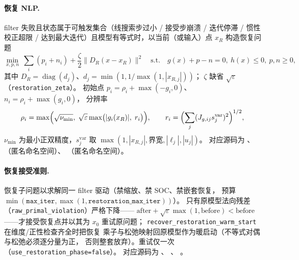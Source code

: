 \paragraph{恢复 NLP.}
filter 失败且状态属于可触发集合（线搜索步过小 / 接受步崩溃 / 迭代停滞 /
惯性校正超限 / 达到最大迭代）且模型有等式时，以当前（或输入）点 $x_R$
构造恢复问题
\begin{equation}
  \min_{x, p, n}\ \sum_i (p_i + n_i) + \frac{\zeta}{2}
  \|D_R (x - x_R)\|^{2}
  \quad \text{s.t.}\quad g(x) + p - n = 0,\ h(x) \le 0,\ p, n \ge 0,
  \label{eq:ipm:restoration}
\end{equation}
其中 $D_R = \operatorname{diag}(d_j)$、$d_j = \min(1, 1/\max(1, |x_{R,j}|))$；
$\zeta$ 缺省 $\sqrt{\varepsilon}$（\texttt{restoration\_zeta}）。
初始点 $p_i = \rho_i + \max(-g_i, 0)$、$n_i = \rho_i + \max(g_i, 0)$，
分辨率
\begin{equation}
  \rho_i = \max\Bigl(\sqrt{\nu_{\min}},\; \sqrt{\varepsilon}
  \max\bigl(|g_i(x_R)|,\; r_i\bigr)\Bigr),\qquad
  r_i = \Bigl(\sum_j (J_{g,ij} s^{\text{var}}_j)^2\Bigr)^{1/2},
  \label{eq:ipm:restoration-resolution}
\end{equation}
$\nu_{\min}$ 为最小正双精度，$s^{\text{var}}_j$ 取
$\max(1, |x_{R,j}|, \text{界宽}, |\ell_j|, |u_j|)$。
对应源码为 、
（匿名命名空间）、
（匿名命名空间）。

\paragraph{恢复接受准则.}
恢复子问题以求解同一 filter 驱动（禁缩放、禁 SOC、禁嵌套恢复，
预算 $\min(\texttt{max\_iter}, \max(1, \texttt{restoration\_max\_iter}))$）。
只有原模型法向残差（\texttt{raw\_primal\_violation}）严格下降——
$\mathrm{after} + \sqrt{\varepsilon}\max(1, \mathrm{before}) <
\mathrm{before}$——才接受恢复点并以其为 $x_0$ 重试原问题；
\texttt{recover\_restoration\_warm\_start} 在维度/正性检查齐全时把恢复
乘子与松弛映射回原模型作为暖启动（不等式对偶与松弛必须逐分量为正，
否则整套放弃）。重试仅一次（\texttt{use\_restoration\_phase=false}）。
对应源码为 、
、
。

